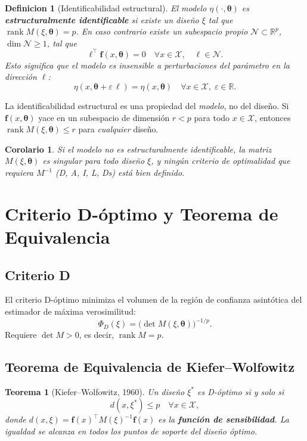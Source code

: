 \documentclass[11pt, a4paper]{article}
\newtheorem{definition}{Definicion}
\newtheorem{theorem}{Teorema}
\newtheorem{corollary}{Corolario}
\DeclareMathOperator{\rank}{rank}
\newcommand{\R}{\mathbb{R}}
\newcommand{\btheta}{\boldsymbol{\theta}}
\newcommand{\ff}{\mathbf{f}}
\begin{document}
\begin{definition}[Identificabilidad estructural]
El modelo $\eta(\cdot, \btheta)$ es \textbf{estructuralmente identificable} si existe un
dise\~no $\xi$ tal que $\rank M(\xi, \btheta) = p$.  En caso contrario existe un subespacio
propio $\mathcal{N} \subset \R^p$, $\dim \mathcal{N} \geq 1$, tal que
\[
  \ell^\top \ff(x, \btheta) = 0 \quad \forall x \in \mathcal{X},
  \quad \ell \in \mathcal{N}.
\]
Esto significa que el modelo es insensible a perturbaciones del par\'ametro en la
direcci\'on $\ell$:
\[
  \eta(x, \btheta + \varepsilon\,\ell) = \eta(x, \btheta) \quad
  \forall x \in \mathcal{X},\; \varepsilon \in \R.
\]
\end{definition}

La identificabilidad estructural es una propiedad del \emph{modelo}, no del dise\~no.
Si $\ff(x, \btheta)$ yace en un subespacio de dimensi\'on $r < p$ para todo
$x \in \mathcal{X}$, entonces $\rank M(\xi,\btheta) \leq r$ para \emph{cualquier} dise\~no.

\begin{corollary}
Si el modelo no es estructuralmente identificable, la matriz $M(\xi,\btheta)$ es singular
para todo dise\~no $\xi$, y ning\'un criterio de optimalidad que requiera $M^{-1}$ (D, A,
I, L, Ds) est\'a bien definido.
\end{corollary}

\section{Criterio D-\'optimo y Teorema de Equivalencia}

\subsection{Criterio D}

El criterio D-\'optimo minimiza el volumen de la regi\'on de confianza asint\'otica del
estimador de m\'axima verosimilitud:
\[
  \Phi_D(\xi) = \bigl(\det M(\xi,\btheta)\bigr)^{-1/p}.
\]
Requiere $\det M > 0$, es decir, $\rank M = p$.

\subsection{Teorema de Equivalencia de Kiefer--Wolfowitz}

\begin{theorem}[Kiefer--Wolfowitz, 1960]
Un dise\~no $\xi^*$ es D-\'optimo si y solo si
\[
  d(x, \xi^*) \leq p \quad \forall x \in \mathcal{X},
\]
donde $d(x, \xi) = \ff(x)^\top M(\xi)^{-1} \ff(x)$ es la \textbf{funci\'on de sensibilidad}.
La igualdad se alcanza en todos los puntos de soporte del dise\~no \'optimo.
\end{theorem}
\end{document}
